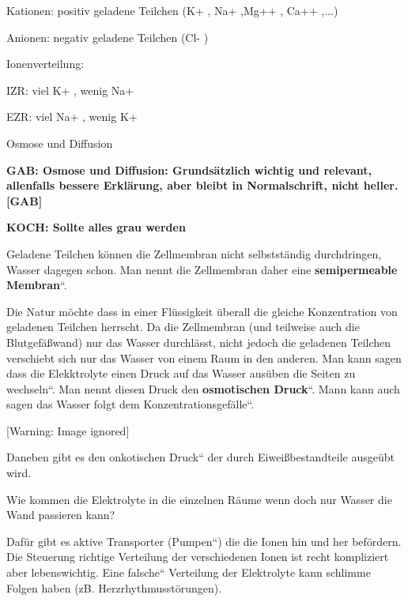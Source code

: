 \documentclass{article}
\newcommand\gT[1]{\textbf{\textup{\textcolor[rgb]{0.0,0.5019608,0.0}{#1}}}}
\newcommand\gZ[1]{\textcolor[rgb]{0.5019608,0.5019608,0.5019608}{#1}}
\begin{document}
{\mdseries
\gZ{Kationen: positiv geladene Teilchen (K+ , Na+ ,Mg++
, Ca++ ,...)}}

{\mdseries
\gZ{Anionen: negativ geladene Teilchen (Cl- )}}

{\mdseries
\gZ{Ionenverteilung:}}

{\mdseries
\gZ{IZR: viel K+ , wenig Na+}}

{\mdseries
\gZ{EZR: viel Na+ , wenig K+}}

{\mdseries\color{black}
%
%
Osmose und Diffusion}

{\bfseries\color[rgb]{0.5019608,0.0,0.0}
GAB: Osmose und Diffusion: Grunds\"atzlich wichtig und relevant,
allenfalls bessere Erkl\"arung, aber bleibt in Normalschrift, nicht
heller. [GAB]}

{\bfseries\color[rgb]{0.5019608,0.0,0.0}
KOCH: Sollte alles grau werden}

{\mdseries
Geladene Teilchen k\"onnen die Zellmembran nicht selbstst\"andig
durchdringen, Wasser dagegen schon. Man nennt die Zellmembran daher
eine {\quotedblbase}\gT{semipermeable Membran}{\textquotedblleft}. }

{\mdseries
Die Natur m\"ochte dass in einer Fl\"ussigkeit \"uberall die gleiche
Konzentration von geladenen Teilchen herrscht. Da die Zellmembran (und
teilweise auch die Blutgef\"a{\ss}wand) nur das Wasser durchl\"asst,
nicht jedoch die geladenen Teilchen verschiebt sich nur das Wasser von
einem Raum in den anderen. Man kann sagen dass die Elekktrolyte einen
Druck auf das Wasser aus\"uben {\quotedblbase}die Seiten zu
wechseln{\textquotedblleft}. Man nennt diesen Druck den
{\quotedblbase}\gT{osmotischen
Druck}{\textquotedblleft}. Mann kann auch sagen {\quotedblbase}das
Wasser folgt dem Konzentrationsgef\"alle{\textquotedblleft}.}

\begin{center}
 [Warning: Image ignored] %

\end{center}
{\mdseries
\gZ{Daneben gibt es den {\quotedblbase}onkotischen
Druck{\textquotedblleft} der durch Eiwei{\ss}bestandteile ausge\"ubt
wird.}}

{\mdseries
Wie kommen die Elektrolyte in die einzelnen R\"aume wenn doch nur Wasser
die Wand passieren kann?}

{\mdseries
Daf\"ur gibt es aktive Transporter
({\quotedblbase}Pumpen{\textquotedblleft}) die die Ionen hin und her
bef\"ordern. Die Steuerung richtige Verteilung der verschiedenen Ionen
ist recht kompliziert aber lebenswichtig. Eine
{\quotedblbase}falsche{\textquotedblleft} Verteilung der Elektrolyte
kann schlimme Folgen haben (zB. Herzrhythmusst\"orungen). }
\end{document}
